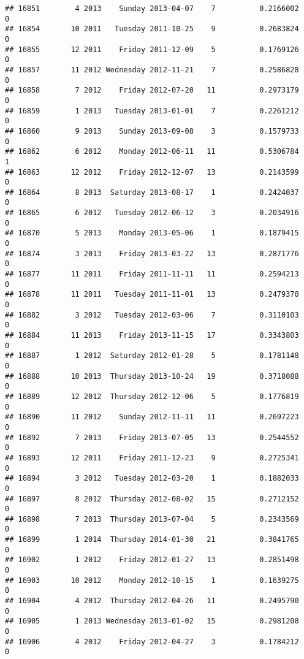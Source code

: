 \documentclass[
]{article}
\begin{document}
\begin{verbatim}
## 16851        4 2013    Sunday 2013-04-07    7          0.2166002             0
## 16854       10 2011   Tuesday 2011-10-25    9          0.2683824             0
## 16855       12 2011    Friday 2011-12-09    5          0.1769126             0
## 16857       11 2012 Wednesday 2012-11-21    7          0.2586828             0
## 16858        7 2012    Friday 2012-07-20   11          0.2973179             0
## 16859        1 2013   Tuesday 2013-01-01    7          0.2261212             0
## 16860        9 2013    Sunday 2013-09-08    3          0.1579733             0
## 16862        6 2012    Monday 2012-06-11   11          0.5306784             1
## 16863       12 2012    Friday 2012-12-07   13          0.2143599             0
## 16864        8 2013  Saturday 2013-08-17    1          0.2424037             0
## 16865        6 2012   Tuesday 2012-06-12    3          0.2034916             0
## 16870        5 2013    Monday 2013-05-06    1          0.1879415             0
## 16874        3 2013    Friday 2013-03-22   13          0.2871776             0
## 16877       11 2011    Friday 2011-11-11   11          0.2594213             0
## 16878       11 2011   Tuesday 2011-11-01   13          0.2479370             0
## 16882        3 2012   Tuesday 2012-03-06    7          0.3110103             0
## 16884       11 2013    Friday 2013-11-15   17          0.3343803             0
## 16887        1 2012  Saturday 2012-01-28    5          0.1781148             0
## 16888       10 2013  Thursday 2013-10-24   19          0.3718088             0
## 16889       12 2012  Thursday 2012-12-06    5          0.1776819             0
## 16890       11 2012    Sunday 2012-11-11   11          0.2697223             0
## 16892        7 2013    Friday 2013-07-05   13          0.2544552             0
## 16893       12 2011    Friday 2011-12-23    9          0.2725341             0
## 16894        3 2012   Tuesday 2012-03-20    1          0.1882033             0
## 16897        8 2012  Thursday 2012-08-02   15          0.2712152             0
## 16898        7 2013  Thursday 2013-07-04    5          0.2343569             0
## 16899        1 2014  Thursday 2014-01-30   21          0.3841765             0
## 16902        1 2012    Friday 2012-01-27   13          0.2851498             0
## 16903       10 2012    Monday 2012-10-15    1          0.1639275             0
## 16904        4 2012  Thursday 2012-04-26   11          0.2495790             0
## 16905        1 2013 Wednesday 2013-01-02   15          0.2981208             0
## 16906        4 2012    Friday 2012-04-27    3          0.1784212             0

\end{verbatim}
\end{document}
